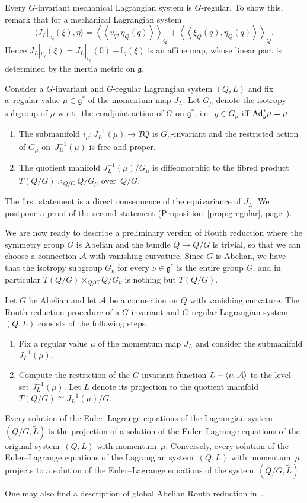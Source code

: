 \documentclass[pdftex]{sigma}
\renewcommand{\ll}{\left<\!\left<}
\renewcommand{\gg}{\right>\!\right>}
\newcommand{\A}{{\cal A}}
\newcommand{\lag}{\mathfrak{g}}
\begin{document}
Every $G$-invariant mechanical Lagrangian system is $G$-regular. To show this, remark that for a mechanical Lagrangian system \[\langle J_L|_{v_q}(\xi)  , \eta \rangle =\ll v_q,\eta_Q(q)\gg_Q+ \ll \xi_Q(q), \eta_Q(q)\gg_Q.\] Hence $J_L|_{v_q}(\xi) = J_L|_{v_q}(0) + \mathbb{I}_q(\xi)$ is an af\/f\/ine map, whose linear part is determined by the inertia metric on $\lag$.
\begin{proposition}
Consider a $G$-invariant and $G$-regular Lagrangian system $(Q,L)$ and fix a~re\-gu\-lar value $\mu\in\lag^*$ of the momentum map $J_L$. Let $G_\mu$ denote the isotropy subgroup of $\mu$ w.r.t.\ the coadjoint action of $G$ on $\lag^*$, i.e.\ $g\in G_\mu$ iff ${\rm Ad}^*_g\mu = \mu$.
\begin{enumerate}\itemsep=0pt
\item[$1.$] The submanifold $i_\mu:J^{-1}_L(\mu)\to TQ$ is $G_\mu$-invariant and the restricted action of $G_\mu$ on~$J^{-1}_L(\mu)$ is free and proper.
\item[$2.$] The quotient manifold $J^{-1}_L(\mu)/G_\mu$ is diffeomorphic to the fibred product $T(Q/G) \times_{Q/G} Q/G_\mu$ over~$Q/G$.
\end{enumerate}
\end{proposition}
The f\/irst statement is a direct consequence of the equivariance of $J_L$. We postpone a proof of the second statement (Proposition~\ref{prop:gregular}, page~\pageref{prop:gregular}).

We are now ready to describe a preliminary version of Routh reduction where the symmetry group $G$ is Abelian and the bundle $Q\to Q/G$ is trivial, so that we can choose a connection $\A$ with vanishing curvature.  Since $G$ is Abelian, we have that the isotropy subgroup $G_\nu$ for every $\nu \in \lag^*$ is the entire group $G$, and in particular $T(Q/G)\times_{Q/G} Q/G_\nu$ is nothing but $T(Q/G)$.
\begin{theorem} Let $G$ be Abelian and let $\A$ be a connection on $Q$ with vanishing curvature. The Routh reduction procedure of a $G$-invariant and $G$-regular Lagrangian system $(Q,L)$ consists of the following steps.
\begin{enumerate}\itemsep=0pt
\item[$1.$] Fix a regular value $\mu$ of the momentum map $J_L$ and consider the submanifold $
J^{-1}_L(\mu)$.
\item[$2.$] Compute the restriction of the $G$-invariant function $L-\langle \mu , \A \rangle$ to the level set $J^{-1}_L(\mu)$. Let $\tilde L$ denote its projection to the quotient manifold $T(Q/G)\cong J^{-1}_L(\mu)/G$.
\end{enumerate}
Every solution of the Euler--Lagrange equations of the Lagrangian system $(Q/G,\tilde L)$ is the projection of a solution of the Euler--Lagrange equations of the original system~$(Q,L)$ with momentum~$\mu$. Conversely, every solution of the Euler--Lagrange equations of the Lagrangian system~$(Q,L)$ with momentum~$\mu$ projects to a solution of the Euler--Lagrange equations of the system~$(Q/G,\tilde L)$.
\end{theorem}
One may also f\/ind a description of global Abelian Routh reduction in~\cite{arnold}.
\end{document}
